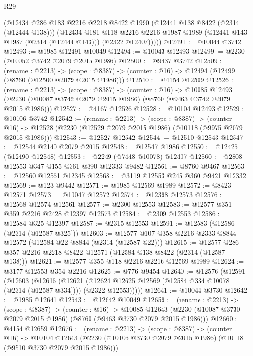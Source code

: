 \begin{lexlean}{R29}
\begin{coremodule}
        (@12434
          @286
          @183
          @2216
          @2218
          @8422
          @1990
          (@12441 @138 @8422 (@2314 (@12444 @138)))
          (@12434
            @181
            @118
            @2216
            @2216
            @1987
            @1989
            (@12441 @143 @1987 (@2314 (@12444 @143)))
            (@2322 @12407)))))
@12491 := @10044 @3742
@12493 := @1985 @12491 @10049
@12494 := @10043 @12493
@12499 := @2230 (@10052 @3742 @2079 @2015 @1986)
@12500 := @9437 @3742
@12509 := (rename : @2213) ->
  (scope : @8387) -> (counter : @16) -> @12494 (@12499 (@8760 (@12500 @2079 @2015 @1986)))
@12510 := @4154 @12509
@12526 := (rename : @2213) ->
  (scope : @8387) ->
  (counter : @16) ->
  @10085 @12493 (@2230 (@10087 @3742 @2079 @2015 @1986) (@8760 (@9463 @3742 @2079 @2015 @1986)))
@12527 := @4167 @12526
@12528 := @10104 @12493
@12529 := @10106 @3742
@12542 := (rename : @2213) ->
  (scope : @8387) ->
  (counter : @16) -> @12528 (@2230 (@12529 @2079 @2015 @1986) (@10118 (@9975 @2079 @2015 @1986)))
@12543 := @12527 @12542
@12544 := @12510 @12543
@12547 := @12544 @2140 @2079 @2015
@12548 := @12547 @1986
@12550 := @12426 (@12490 @12548)
@12553 := @2249 (@7448 @10078) @12407
@12560 := @2808 @12553 @347 @155 @361 @390 @12333 @9482
@12561 := @8760 @9467
@12563 := @12560 @12561 @12345
@12568 := @3119 @12553 @245 @360 @9421 @12332
@12569 := @123 @9442
@12571 := @1985 @12569 @1989
@12572 := @8423 @12571
@12573 := @10047 @12572
@12574 := @12398 @12573
@12576 := @12568 @12574 @12561
@12577 := @2300 @12553
@12583 := @12577 @351 @359 @2216 @2428 @12397 @12573
@12584 := @2309 @12553
@12586 := @12584 @325 @12397
@12587 := @2315 @12553
@12591 := @12583 (@12586 (@2314 (@12587 @325)))
@12603 := @12577 @107 @358 @2216 @2333 @8844 @12572 (@12584 @22 @8844 (@2314 (@12587 @22)))
@12615 := @12577 @286 @357 @2216 @2218 @8422 @12571 (@12584 @138 @8422 (@2314 (@12587 @138)))
@12621 := @12577 @355 @118 @2216 @2216 @12569 @1989
@12624 := @3177 @12553 @354 @2216
@12625 := @776 @9454
@12640 := @12576
    (@12591
      (@12603
        (@12615
          (@12621
            (@12624 @12625 @12569 (@12584 @334 @10078 (@2314 (@12587 @334))))
            (@2322 @12553)))))
@12641 := @10044 @3730
@12642 := @1985 @12641
@12643 := @12642 @10049
@12659 := (rename : @2213) ->
  (scope : @8387) ->
  (counter : @16) ->
  @10085 @12643 (@2230 (@10087 @3730 @2079 @2015 @1986) (@8760 (@9463 @3730 @2079 @2015 @1986)))
@12660 := @4154 @12659
@12676 := (rename : @2213) ->
  (scope : @8387) ->
  (counter : @16) ->
  @10104 @12643 (@2230 (@10106 @3730 @2079 @2015 @1986) (@10118 (@9510 @3730 @2079 @2015 @1986)))

\end{coremodule}
\end{lexlean}
